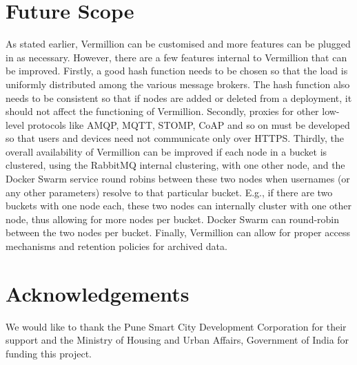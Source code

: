 \documentclass[conference, 10pt]{IEEEtran}
\begin{document}
\section{Future Scope}
As stated earlier, Vermillion can be customised and more features can be plugged in as necessary. However, there are a few features internal to Vermillion that can be improved. Firstly, a good hash function needs to be chosen so that the load is uniformly distributed among the various message brokers. The hash function also needs to be consistent so that if nodes are added or deleted from a deployment, it should not affect the functioning of Vermillion. Secondly, proxies for other low-level protocols like AMQP, MQTT, STOMP, CoAP and so on must be developed so that users and devices need not communicate only over HTTPS. Thirdly, the overall availability of Vermillion can be improved if each node in a bucket is clustered, using the RabbitMQ internal clustering, with one other node, and the Docker Swarm service round robins between these two nodes when usernames (or any other parameters) resolve to that particular bucket. E.g., if there are two buckets with one node each, these two nodes can internally cluster with one other node, thus allowing for more nodes per bucket. Docker Swarm can round-robin between the two nodes per bucket. Finally, Vermillion can allow for proper access mechanisms and retention policies for archived data.

\section{Acknowledgements}
We would like to thank the Pune Smart City Development Corporation for their support and the Ministry of Housing and Urban Affairs, Government of India for funding this project. 


 
\end{document}
